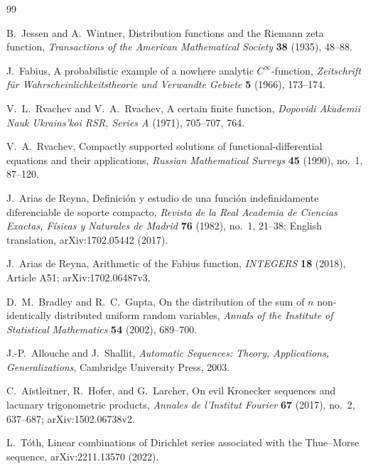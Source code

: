 \documentclass[11pt,oneside]{article}
\theoremstyle{definition}
\theoremstyle{remark}
\begin{document}
\begin{thebibliography}{99}

B.~Jessen and A.~Wintner,
\newblock Distribution functions and the Riemann zeta function,
\newblock \emph{Transactions of the American Mathematical Society} \textbf{38} (1935),
48--88.

J.~Fabius,
\newblock A probabilistic example of a nowhere analytic $C^\infty$-function,
\newblock \emph{Zeitschrift f\"ur Wahrscheinlichkeitstheorie und Verwandte Gebiete}
\textbf{5} (1966), 173--174.

V.~L.~Rvachev and V.~A.~Rvachev,
\newblock A certain finite function,
\newblock \emph{Dopovidi Akademii Nauk Ukrains'koi RSR, Series A} (1971), 705--707, 764.

V.~A.~Rvachev,
\newblock Compactly supported solutions of functional-differential equations and their
applications,
\newblock \emph{Russian Mathematical Surveys} \textbf{45} (1990), no.~1, 87--120.

J.~Arias de Reyna,
\newblock Definici\'on y estudio de una funci\'on indefinidamente diferenciable de soporte
compacto,
\newblock \emph{Revista de la Real Academia de Ciencias Exactas, F\'isicas y Naturales de
Madrid} \textbf{76} (1982), no.~1, 21--38; English translation, arXiv:1702.05442 (2017).

J.~Arias de Reyna,
\newblock Arithmetic of the Fabius function,
\newblock \emph{INTEGERS} \textbf{18} (2018), Article A51; arXiv:1702.06487v3.

D.~M.~Bradley and R.~C.~Gupta,
\newblock On the distribution of the sum of $n$ non-identically distributed uniform random
variables,
\newblock \emph{Annals of the Institute of Statistical Mathematics} \textbf{54} (2002),
689--700.

J.-P.~Allouche and J.~Shallit,
\newblock \emph{Automatic Sequences: Theory, Applications, Generalizations},
\newblock Cambridge University Press, 2003.

C.~Aistleitner, R.~Hofer, and G.~Larcher,
\newblock On evil Kronecker sequences and lacunary trigonometric products,
\newblock \emph{Annales de l'Institut Fourier} \textbf{67} (2017), no.~2, 637--687;
arXiv:1502.06738v2.

L.~T\'oth,
\newblock Linear combinations of Dirichlet series associated with the Thue--Morse sequence,
\newblock arXiv:2211.13570 (2022).


\end{thebibliography}
\end{document}
